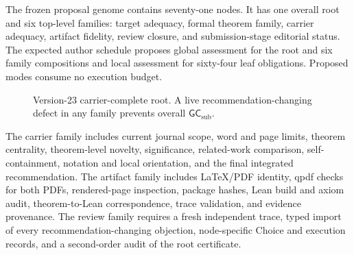 \documentclass[10pt]{article}
\newcommand{\Target}{\Theta}
\newcommand{\GCsub}{\mathsf{GC}_{\mathrm{sub}}}
\newcommand{\Carrier}{\mathsf{Carrier}}
\begin{document}
The frozen proposal genome contains seventy-one nodes.  It has one overall root and six top-level families: target adequacy, formal theorem family, carrier adequacy, artifact fidelity, review closure, and submission-stage editorial status.  The expected author schedule proposes global assessment for the root and six family compositions and local assessment for sixty-four leaf obligations.  Proposed modes consume no execution budget.

\begin{figure}[ht]
\centering
{}
\caption{Version-23 carrier-complete root.  A live recommendation-changing defect in any family prevents overall $\GCsub$.}
\label{fig:carrier-genome}
\end{figure}

The carrier family includes current journal scope, word and page limits, theorem centrality, theorem-level novelty, significance, related-work comparison, self-containment, notation and local orientation, and the final integrated recommendation.  The artifact family includes LaTeX/PDF identity, qpdf checks for both PDFs, rendered-page inspection, package hashes, Lean build and axiom audit, theorem-to-Lean correspondence, trace validation, and evidence provenance.  The review family requires a fresh independent trace, typed import of every recommendation-changing objection, node-specific Choice and execution records, and a second-order audit of the root certificate.
\end{document}
